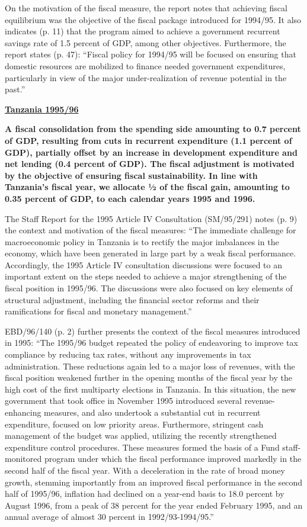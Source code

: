 On the motivation of the fiscal measure, the report notes that achieving fiscal equilibrium was the objective of the fiscal package introduced for 1994/95. It also indicates (p. 11) that the program aimed to achieve a government recurrent savings rate of 1.5 percent of GDP, among other objectives. Furthermore, the report states (p. 47): “Fiscal policy for 1994/95 will be focused on ensuring that domestic resources are mobilized to finance needed government expenditures, particularly in view of the major under-realization of revenue potential in the past.”

\textbf{\underline{Tanzania 1995/96}}

\textbf{A fiscal consolidation from the spending side amounting to 0.7 percent of GDP, resulting from cuts in recurrent expenditure (1.1 percent of GDP), partially offset by an increase in development expenditure and net lending (0.4 percent of GDP). The fiscal adjustment is motivated by the objective of ensuring fiscal sustainability. In line with Tanzania’s fiscal year, we allocate ½ of the fiscal gain, amounting to 0.35 percent of GDP, to each calendar years 1995 and 1996.}

The Staff Report for the 1995 Article IV Consultation (SM/95/291) notes (p. 9) the context and motivation of the fiscal measures: “The immediate challenge for macroeconomic policy in Tanzania is to rectify the major imbalances in the economy, which have been generated in large part by a weak fiscal performance. Accordingly, the 1995 Article IV consultation discussions were focused to an important extent on the steps needed to achieve a major strengthening of the fiscal position in 1995/96. The discussions were also focused on key elements of structural adjustment, including the financial sector reforms and their ramifications for fiscal and monetary management.”

EBD/96/140 (p. 2) further presents the context of the fiscal measures introduced in 1995: “The 1995/96 budget repeated the policy of endeavoring to improve tax compliance by reducing tax rates, without any improvements in tax administration. These reductions again led to a major loss of revenues, with the fiscal position weakened further in the opening months of the fiscal year by the high cost of the first multiparty elections in Tanzania. In this situation, the new government that took office in November 1995 introduced several revenue-enhancing measures, and also undertook a substantial cut in recurrent expenditure, focused on low priority areas. Furthermore, stringent cash management of the budget was applied, utilizing the recently strengthened expenditure control procedures. These measures formed the basis of a Fund staff-monitored program under which the fiscal performance improved markedly in the second half of the fiscal year. With a deceleration in the rate of broad money growth, stemming importantly from an improved fiscal performance in the second half of 1995/96, inflation had declined on a year-end basis to 18.0 percent by August 1996, from a peak of 38 percent for the year ended February 1995, and an annual average of almost 30 percent in 1992/93-1994/95.”

